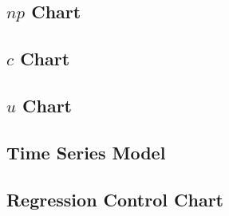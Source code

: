 \subsection{$np$ Chart}
\subsection{$c$ Chart}
\subsection{$u$ Chart}
\subsection{Time Series Model}
\subsection{Regression Control Chart}




